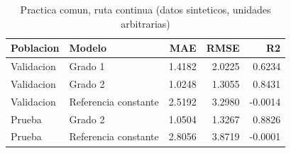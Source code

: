 \begin{table}[H]
\centering
\small
\caption{Practica comun, ruta continua (datos sinteticos, unidades arbitrarias)}
\begin{tabular}{llrrr}
\toprule
\textbf{Poblacion} & \textbf{Modelo} & \textbf{MAE} & \textbf{RMSE} & \textbf{R2} \\
\midrule
Validacion & Grado 1 & 1.4182 & 2.0225 & 0.6234 \\
Validacion & Grado 2 & 1.0248 & 1.3055 & 0.8431 \\
Validacion & Referencia constante & 2.5192 & 3.2980 & -0.0014 \\
Prueba & Grado 2 & 1.0504 & 1.3267 & 0.8826 \\
Prueba & Referencia constante & 2.8056 & 3.8719 & -0.0001 \\
\bottomrule
\end{tabular}
\end{table}
